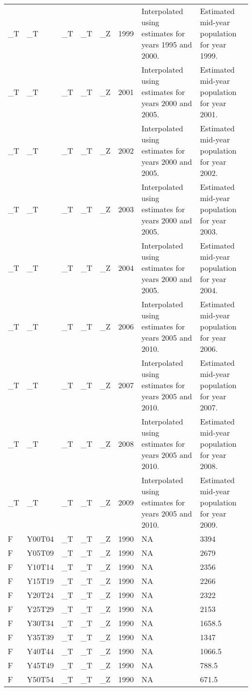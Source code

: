\begin{longtable}[t]{llllllll}
\_T & \_T & \_T & \_T & \_Z & 1999 & Interpolated using estimates for years 1995 and 2000. & Estimated mid-year population for year 1999.\\
\addlinespace
\_T & \_T & \_T & \_T & \_Z & 2001 & Interpolated using estimates for years 2000 and 2005. & Estimated mid-year population for year 2001.\\
\_T & \_T & \_T & \_T & \_Z & 2002 & Interpolated using estimates for years 2000 and 2005. & Estimated mid-year population for year 2002.\\
\_T & \_T & \_T & \_T & \_Z & 2003 & Interpolated using estimates for years 2000 and 2005. & Estimated mid-year population for year 2003.\\
\_T & \_T & \_T & \_T & \_Z & 2004 & Interpolated using estimates for years 2000 and 2005. & Estimated mid-year population for year 2004.\\
\_T & \_T & \_T & \_T & \_Z & 2006 & Interpolated using estimates for years 2005 and 2010. & Estimated mid-year population for year 2006.\\
\addlinespace
\_T & \_T & \_T & \_T & \_Z & 2007 & Interpolated using estimates for years 2005 and 2010. & Estimated mid-year population for year 2007.\\
\_T & \_T & \_T & \_T & \_Z & 2008 & Interpolated using estimates for years 2005 and 2010. & Estimated mid-year population for year 2008.\\
\_T & \_T & \_T & \_T & \_Z & 2009 & Interpolated using estimates for years 2005 and 2010. & Estimated mid-year population for year 2009.\\
F & Y00T04 & \_T & \_T & \_Z & 1990 & NA & 3394\\
F & Y05T09 & \_T & \_T & \_Z & 1990 & NA & 2679\\
\addlinespace
F & Y10T14 & \_T & \_T & \_Z & 1990 & NA & 2356\\
F & Y15T19 & \_T & \_T & \_Z & 1990 & NA & 2266\\
F & Y20T24 & \_T & \_T & \_Z & 1990 & NA & 2322\\
F & Y25T29 & \_T & \_T & \_Z & 1990 & NA & 2153\\
F & Y30T34 & \_T & \_T & \_Z & 1990 & NA & 1658.5\\
\addlinespace
F & Y35T39 & \_T & \_T & \_Z & 1990 & NA & 1347\\
F & Y40T44 & \_T & \_T & \_Z & 1990 & NA & 1066.5\\
F & Y45T49 & \_T & \_T & \_Z & 1990 & NA & 788.5\\
F & Y50T54 & \_T & \_T & \_Z & 1990 & NA & 671.5\\

\end{longtable}

